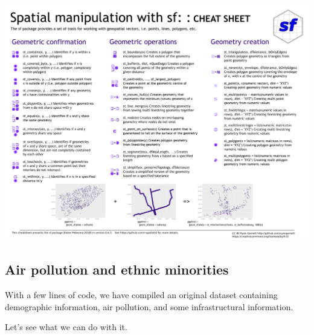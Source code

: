 \documentclass[
  letterpaper,
  DIV=11,
  numbers=noendperiod]{scrreprt}
\begin{document}
\includegraphics{fig/sf_1.png}

\hypertarget{air-pollution-and-ethnic-minorities}{%
\subsection{Air pollution and ethnic
minorities}\label{air-pollution-and-ethnic-minorities}}

With a few lines of code, we have compiled an original dataset
containing demographic information, air pollution, and some
infrastructural information.

Let's see what we can do with it.
\end{document}
